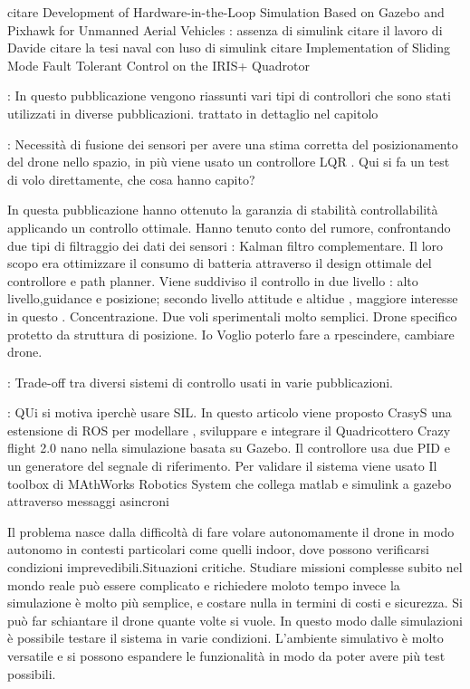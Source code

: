 
\begin{commento}
citare Development of Hardware-in-the-Loop Simulation Based on Gazebo
	and Pixhawk for Unmanned Aerial Vehicles : assenza di simulink
citare il lavoro di Davide
citare la tesi naval con luso di simulink
citare Implementation of Sliding Mode Fault Tolerant Control on the IRIS+
Quadrotor
\end{commento}

\begin{idee}
\cite{KimJinho2020ACSo} : In questo pubblicazione vengono riassunti vari tipi di controllori che sono stati utilizzati in diverse pubblicazioni. trattato in dettaglio nel capitolo

\cite{KoksalN2018ALQA} : Necessità di fusione dei sensori per avere una stima corretta del posizionamento del drone nello spazio, in più viene usato un controllore LQR . Qui si fa un test di volo direttamente, che cosa hanno capito?

In questa pubblicazione hanno ottenuto la garanzia di stabilità controllabilità applicando un controllo ottimale.
Hanno tenuto conto del rumore, confrontando due tipi di filtraggio dei dati dei sensori : Kalman filtro complementare. Il loro scopo era ottimizzare il consumo di batteria attraverso il design ottimale del controllore e path planner. Viene suddiviso il controllo in due livello : alto livello,guidance e posizione; secondo livello attitude e altidue , maggiore interesse in questo . Concentrazione. Due voli sperimentali molto semplici. Drone specifico protetto da struttura di posizione. Io Voglio poterlo fare a rpescindere, cambiare drone.

\cite{ZuluAndrew2014ARoC} : Trade-off tra diversi sistemi di controllo usati in varie pubblicazioni.



\cite{CrazyS} :  QUi si motiva iperchè usare SIL. In questo articolo viene proposto CrasyS una estensione di ROS per modellare , sviluppare e integrare il Quadricottero Crazy flight 2.0 nano nella simulazione basata su Gazebo. Il controllore usa due PID e un generatore del segnale di riferimento. Per validare il sistema viene usato Il toolbox  di MAthWorks Robotics System che collega matlab e simulink a gazebo attraverso messaggi asincroni

Il problema nasce dalla difficoltà di fare volare autonomamente il drone in modo autonomo in contesti particolari come quelli indoor, dove possono verificarsi condizioni imprevedibili.Situazioni critiche. Studiare missioni complesse subito nel mondo reale può essere complicato e richiedere moloto tempo invece la simulazione è molto più semplice, e costare nulla in termini di costi e sicurezza. Si può far schiantare il drone quante volte si vuole. In questo modo dalle simulazioni è possibile testare il sistema in varie condizioni. L'ambiente simulativo è molto versatile e si possono espandere le funzionalità in modo da poter avere più test possibili.


\end{idee}
